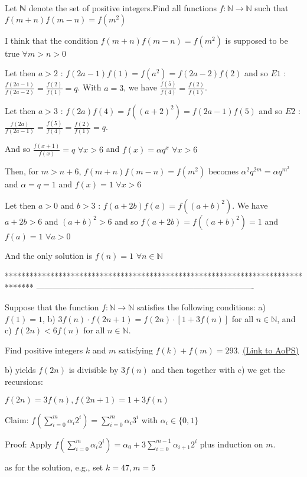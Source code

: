 \begin{mysolution}
	\begin{tcolorbox}Let ℕ  denote the set of positive integers.Find all functions $ f:\mathbb{N}\rightarrow\mathbb{N}$ such that $ f(m+n)f(m-n) = f(m^{2})$\end{tcolorbox}

I think that the condition $ f(m+n)f(m-n) = f(m^{2})$ is supposed to be true $ \forall m > n > 0$

Let then $ a > 2$ : $ f(2a-1)f(1) = f(a^{2}) = f(2a-2)f(2)$ and so $ E1$ : $ \frac{f(2a-1)}{f(2a-2)}=\frac{f(2)}{f(1)}= q$.
With $ a = 3$, we have $ \frac{f(5)}{f(4)}=\frac{f(2)}{f(1)}$.

Let then $ a > 3$ : $ f(2a)f(4) = f((a+2)^{2}) = f(2a-1)f(5)$ and so $ E2$ : $ \frac{f(2a)}{f(2a-1)}=\frac{f(5)}{f(4)}=\frac{f(2)}{f(1)}= q$.

And so $ \frac{f(x+1)}{f(x)}= q$ $ \forall x > 6$ and $ f(x) =\alpha q^{x}$ $ \forall x > 6$

Then, for $ m > n+6$, $ f(m+n)f(m-n) = f(m^{2})$ becomes $ \alpha^{2}q^{2m}=\alpha q^{m^{2}}$ and $ \alpha = q = 1$ and $ f(x) = 1$ $ \forall x > 6$

Let then $ a > 0$ and $ b > 3$ : $ f(a+2b)f(a) = f((a+b)^{2})$. We have $ a+2b > 6$ and $ (a+b)^{2}> 6$ and so $ f(a+2b) = f((a+b)^{2}) = 1$ and $ f(a) = 1$ $ \forall a > 0$

And the only solution is $ f(n) = 1$ $ \forall n\in\mathbb{N}$
\end{mysolution}
*******************************************************************************
-------------------------------------------------------------------------------

\begin{problem}
	Suppose that the function $f: \mathbb N \to \mathbb N$ satisfies the following conditions:
a) $ f(1)=1$,
b) $ 3f(n) \cdot f(2n+1) = f(2n) \cdot [1 + 3f(n)]$ for all $n \in \mathbb N$, and
c) $ f(2n)<6f(n)$ for all $n \in \mathbb N$.

Find positive integers $k$ and $m$ satisfying $f(k)+f(m)=293$.
	\flushright \href{https://artofproblemsolving.com/community/c6h168725}{(Link to AoPS)}
\end{problem}



\begin{mysolution}
	b) yields $ f(2n)$ is divisible by $ 3f(n)$ and then together with c) we get the recursions:

$ f(2n)=3f(n),f(2n+1)=1+3f(n)$

Claim: $ f(\sum_{i=0}^m\alpha_i2^i)=\sum_{i=0}^m\alpha_i3^i$ with $ \alpha_i\in\{0,1\}$

Proof: Apply $ f(\sum_{i=0}^m\alpha_i2^i)=\alpha_0+3\sum_{i=0}^{m-1}\alpha_{i+1}2^i$ plus induction on $ m$.

as for the solution, e.g., set $ k=47,m=5$
\end{mysolution}



